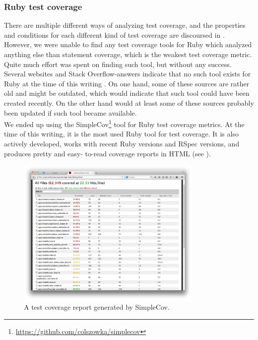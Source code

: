 \label{sec:coverage_frameworks}

\subsubsection{Ruby test coverage}
There are multiple different ways of analyzing test coverage, and the
properties and conditions for each different kind of test coverage are
discoursed in . However, we were unable to find any
test coverage tools for Ruby which analyzed anything else than statement
coverage, which is the weakest test coverage metric. Quite much effort
was spent on finding such tool, but without any success. Several
websites and Stack Overflow-answers indicate that no such tool exists
for Ruby at the time of this writing \cite{web:coverage_ruby19,
so:c1c2_coverage, so:c1_coverage, web:toolbox_code_metrics}. On one
hand, some of these sources are rather old and might be outdated, which
would indicate that such tool could have been created recently. On the
other hand would at least some of these sources probably been updated if
such tool became available.\\

We ended up using the
SimpleCov\footnote{\url{https://github.com/colszowka/simplecov}} tool
for Ruby test coverage metrics. At the time of this writing, it is the
most used Ruby tool for test coverage. It is also actively developed,
works with recent Ruby versions and RSpec versions, and produces pretty
and easy- to-read coverage reports in HTML (see
). \cite{web:toolbox_code_metrics}\\

\begin{figure}
\centering
\includegraphics[width=0.8\textwidth]{results/choices/simplecov}
\caption{A test coverage report generated by SimpleCov.}
\label{fig:simplecov_report}
\end{figure}


